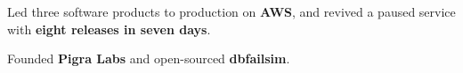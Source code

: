 \item Led three software products to production on \textbf{AWS}, and revived a paused service with \textbf{eight releases in seven days}.
\item Founded \textbf{Pigra Labs} and open-sourced \textbf{dbfailsim}.
